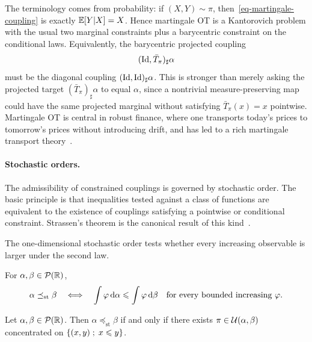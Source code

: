 The terminology comes from probability: if $(X,Y)\sim\pi$, then~\eqref{eq-martingale-coupling} is exactly $\mathbb{E}[Y|X]=X$. Hence martingale OT is a Kantorovich problem with the usual two marginal constraints plus a barycentric constraint on the conditional laws. Equivalently, the barycentric projected coupling
\[
	(\mathrm{Id},\bar T_\pi)_\sharp\alpha
\]
must be the diagonal coupling $(\mathrm{Id},\mathrm{Id})_\sharp\alpha$. This is stronger than merely asking the projected target $(\bar T_\pi)_\sharp\alpha$ to equal $\alpha$, since a nontrivial measure-preserving map could have the same projected marginal without satisfying $\bar T_\pi(x)=x$ pointwise. Martingale OT is central in robust finance, where one transports today's prices to tomorrow's prices without introducing drift, and has led to a rich martingale transport theory~\cite{beiglbock2013model,GalichonMartingale,dolinsky2014martingale,guo2017computational}.

\paragraph{Stochastic orders.}
The admissibility of constrained couplings is governed by stochastic order. The basic principle is that inequalities tested against a class of functions are equivalent to the existence of couplings satisfying a pointwise or conditional constraint. Strassen's theorem is the canonical result of this kind~\cite{Strassen1965}.

The one-dimensional stochastic order tests whether every increasing observable is larger under the second law.
\begin{defn}\label{def-classical-stochastic-order}
For $\alpha,\beta\in\mathcal{P}(\mathbb{R})$,
\[
\alpha\preceq_{\mathrm{st}}\beta
\quad\Longleftrightarrow\quad
\int\varphi\,\mathrm{d}\alpha\leqslant\int\varphi\,\mathrm{d}\beta
\quad\text{for every bounded increasing }\varphi.
\]
\end{defn}

\begin{prop}\label{prop-strassen-stochastic-order}
	Let $\alpha,\beta\in\mathcal{P}(\mathbb{R})$. Then $\alpha\preceq_{\mathrm{st}}\beta$ if and only if there exists $\pi\in\mathcal{U}(\alpha,\beta)$ concentrated on $\left\{ (x,y) \;;\; x\leqslant y \right\}$.
\end{prop}

